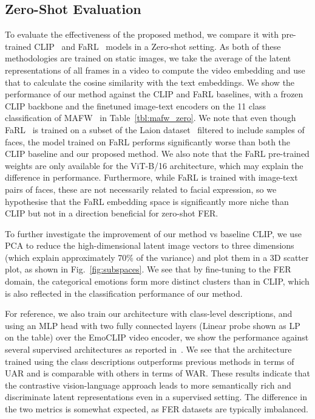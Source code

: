 \documentclass[10pt,twocolumn,letterpaper]{article}
\begin{document}
\subsection{Zero-Shot Evaluation}
\label{sec:zero}
To evaluate the effectiveness of the proposed method, we compare it with pre-trained CLIP~\cite{radford_CLIP_2021} and FaRL~\cite{zheng_FARL_2022} models in a Zero-shot setting. As both of these methodologies are trained on static images, we take the average of the latent representations of all frames in a video to compute the video embedding and use that to calculate the cosine similarity with the text embeddings. 
We show the performance of our method against the CLIP and FaRL baselines, with a frozen CLIP backbone and the finetuned image-text encoders on the 11 class classification of MAFW~\cite{liu_mafw_2022} in Table~\ref{tbl:mafw_zero}. We note that even though FaRL~\cite{zheng_FARL_2022} is trained on a subset of the Laion dataset~\cite{laion} filtered to include samples of faces, the model trained on FaRL performs significantly worse than both the CLIP baseline and our proposed method. We also note that the FaRL pre-trained weights are only available for the ViT-B/16 architecture, which may explain the difference in performance. Furthermore, while FaRL is trained with image-text pairs of faces, these are not necessarily related to facial expression, so we hypothesise that the FaRL embedding space is significantly more niche than CLIP but not in a direction beneficial for zero-shot FER.

To further investigate the improvement of our method vs baseline CLIP, we use PCA to reduce the high-dimensional latent image vectors to three dimensions (which explain approximately 70\% of the variance) and plot them in a 3D scatter plot, as shown in Fig.~\ref{fig:subspaces}. We see that by fine-tuning to the FER domain, the categorical emotions form more distinct clusters than in CLIP, which is also reflected in the classification performance of our method.


For reference, we also train our architecture with class-level descriptions, and using an MLP head with two fully connected layers (Linear probe shown as LP on the table) over the EmoCLIP video encoder, we show the performance against several supervised architectures as reported in~\cite{liu_mafw_2022}. We see that the architecture trained using the class descriptions outperforms previous methods in terms of UAR and is comparable with others in terms of WAR. These results indicate that the contrastive vision-language approach leads to more semantically rich and discriminate latent representations even in a supervised setting. The difference in the two metrics is somewhat expected, as FER datasets are typically imbalanced.
\end{document}
